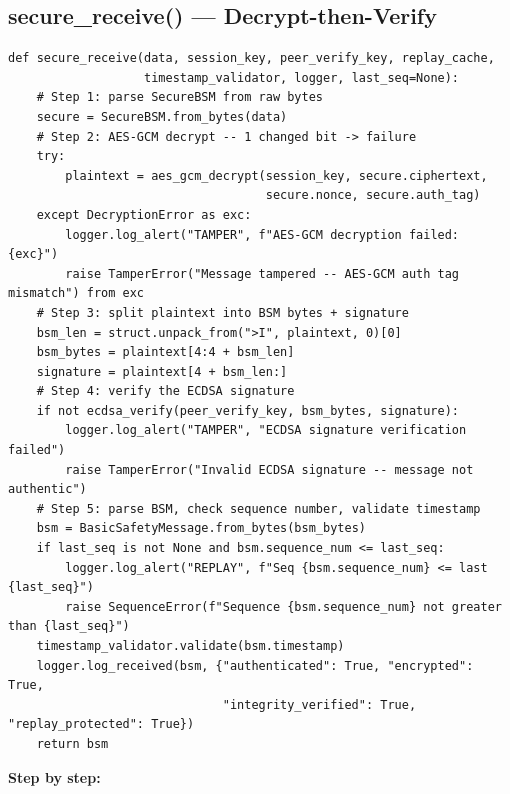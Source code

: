 \documentclass[11pt,a4paper]{article}
\begin{document}
\subsection{secure\_receive() --- Decrypt-then-Verify}
\begin{lstlisting}[style=py,caption={v2v\_protocol.py --- secure\_receive: the receiving pipeline.}]
def secure_receive(data, session_key, peer_verify_key, replay_cache,
                   timestamp_validator, logger, last_seq=None):
    # Step 1: parse SecureBSM from raw bytes
    secure = SecureBSM.from_bytes(data)
    # Step 2: AES-GCM decrypt -- 1 changed bit -> failure
    try:
        plaintext = aes_gcm_decrypt(session_key, secure.ciphertext,
                                    secure.nonce, secure.auth_tag)
    except DecryptionError as exc:
        logger.log_alert("TAMPER", f"AES-GCM decryption failed: {exc}")
        raise TamperError("Message tampered -- AES-GCM auth tag mismatch") from exc
    # Step 3: split plaintext into BSM bytes + signature
    bsm_len = struct.unpack_from(">I", plaintext, 0)[0]
    bsm_bytes = plaintext[4:4 + bsm_len]
    signature = plaintext[4 + bsm_len:]
    # Step 4: verify the ECDSA signature
    if not ecdsa_verify(peer_verify_key, bsm_bytes, signature):
        logger.log_alert("TAMPER", "ECDSA signature verification failed")
        raise TamperError("Invalid ECDSA signature -- message not authentic")
    # Step 5: parse BSM, check sequence number, validate timestamp
    bsm = BasicSafetyMessage.from_bytes(bsm_bytes)
    if last_seq is not None and bsm.sequence_num <= last_seq:
        logger.log_alert("REPLAY", f"Seq {bsm.sequence_num} <= last {last_seq}")
        raise SequenceError(f"Sequence {bsm.sequence_num} not greater than {last_seq}")
    timestamp_validator.validate(bsm.timestamp)
    logger.log_received(bsm, {"authenticated": True, "encrypted": True,
                              "integrity_verified": True, "replay_protected": True})
    return bsm
\end{lstlisting}
\textbf{Step by step:}
\end{document}

